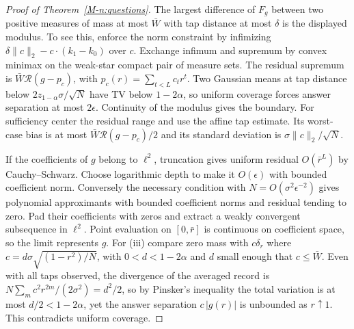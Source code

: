 \documentclass[12pt]{article}
\theoremstyle{definition}
\theoremstyle{remark}
\begin{document}
\begin{proof}[Proof of Theorem~\ref{M-n:questions}]
The largest difference of $F_g$ between two positive measures of mass at most $\bar W$ with tap distance at most $\delta$ is the displayed modulus. To see this, enforce the norm constraint by infimizing $\delta\|c\|_2-c\cdot(k_1-k_0)$ over $c$. Exchange infimum and supremum by convex minimax on the weak-star compact pair of measure sets. The residual supremum is $\bar W\mathcal R(g-p_c)$, with $p_c(r)=\sum_{t<L}c_t r^t$. Two Gaussian means at tap distance below $2z_{1-\alpha}\sigma/\sqrt N$ have TV below $1-2\alpha$, so uniform coverage forces answer separation at most $2\epsilon$. Continuity of the modulus gives the boundary. For sufficiency center the residual range and use the affine tap estimate. Its worst-case bias is at most $\bar W\mathcal R(g-p_c)/2$ and its standard deviation is $\sigma\|c\|_2/\sqrt N$.

If the coefficients of $g$ belong to $\ell^2$, truncation gives uniform residual $O(\bar r^L)$ by Cauchy--Schwarz. Choose logarithmic depth to make it $O(\epsilon)$ with bounded coefficient norm. Conversely the necessary condition with $N=O(\sigma^2\epsilon^{-2})$ gives polynomial approximants with bounded coefficient norms and residual tending to zero. Pad their coefficients with zeros and extract a weakly convergent subsequence in $\ell^2$. Point evaluation on $[0,\bar r]$ is continuous on coefficient space, so the limit represents $g$. For (iii) compare zero mass with $c\delta_r$ where $c=d\sigma\sqrt{(1-r^2)/N}$, with $0<d<1-2\alpha$ and $d$ small enough that $c\le\bar W$. Even with all taps observed, the divergence of the averaged record is $N\sum_m c^2r^{2m}/(2\sigma^2)=d^2/2$, so by Pinsker's inequality the total variation is at most $d/2<1-2\alpha$, yet the answer separation $c\,|g(r)|$ is unbounded as $r\uparrow1$. This contradicts uniform coverage.
\end{proof}
\end{document}
